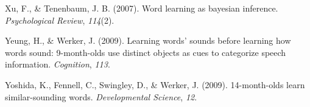\documentclass[english,,man,floatsintext]{apa6}
\theoremstyle{definition}
\theoremstyle{definition}
\theoremstyle{definition}
\theoremstyle{remark}
\begin{document}
\hypertarget{ref-xu2007}{}
Xu, F., \& Tenenbaum, J. B. (2007). Word learning as bayesian inference.
\emph{Psychological Review}, \emph{114}(2).

\hypertarget{ref-yeung09}{}
Yeung, H., \& Werker, J. (2009). Learning words' sounds before learning
how words sound: 9-month-olds use distinct objects as cues to categorize
speech information. \emph{Cognition}, \emph{113}.

\hypertarget{ref-yoshida2009}{}
Yoshida, K., Fennell, C., Swingley, D., \& Werker, J. (2009).
14-month-olds learn similar-sounding words. \emph{Developmental
Science}, \emph{12}.
\end{document}
